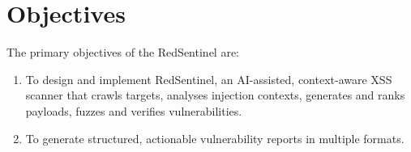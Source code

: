 \section{ Objectives}
The primary objectives of the RedSentinel are:
\begin{enumerate}[itemsep=2pt, topsep=-15pt]
    \item To design and implement RedSentinel, an AI-assisted, context-aware XSS scanner that crawls targets, analyses injection contexts, generates and ranks payloads, fuzzes and verifies vulnerabilities.
    \item To generate structured, actionable vulnerability reports in multiple formats.
\end{enumerate}
